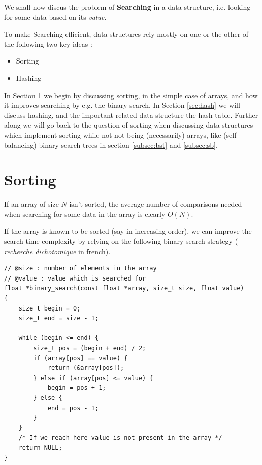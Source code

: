 \documentclass[12pt]{article}
\theoremstyle{plain}
\theoremstyle{remark}
\begin{document}
\pagebreak

We shall now discus the problem of {\bf Searching} in a data 
structure, i.e. looking for some data based on its {\it value}. 

\medskip

To make Searching efficient, data structures rely mostly on one or the other
of the following two key ideas :

\begin{itemize}
	\item Sorting
	\item Hashing
\end{itemize}

In Section \ref{sec:sort} we begin by discussing sorting, in the simple case 
of arrays, and how it improves searching by e.g. the binary search. 
In Section \ref{sec:hash} we will discuss hashing, and
the important related data structure the hash table. Further along we will go 
back to the question of sorting when discussing data structures which implement 
sorting while not not being (necessarily) arrays, like (self balancing) 
binary search trees in section \ref{subsec:bst} and \ref{subsec:sb}.


\section{Sorting}\label{sec:sort}

If an array of size $N$ isn't sorted, the average number of comparisons needed
when searching for some data in the array is clearly $O(N).$ 

If the array is known to be sorted (say in increasing order), we can improve the
search time complexity by relying on the following binary search strategy ({\it
recherche dichotomique} in french).

\begin{lstlisting}[style=C]
// @size : number of elements in the array
// @value : value which is searched for
float *binary_search(const float *array, size_t size, float value)
{
	size_t begin = 0;
	size_t end = size - 1;

	while (begin <= end) {
		size_t pos = (begin + end) / 2;
		if (array[pos] == value) {
			return (&array[pos]);
		} else if (array[pos] <= value) {
			begin = pos + 1;
		} else {
			end = pos - 1;
		}
	}
	/* If we reach here value is not present in the array */
	return NULL;
}
\end{lstlisting}
\end{document}
